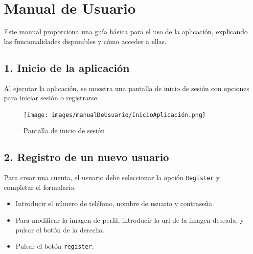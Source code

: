 \section*{Manual de Usuario}

Este manual proporciona una guía básica para el uso de la aplicación, explicando las funcionalidades disponibles y cómo acceder a ellas.

\subsection*{1. Inicio de la aplicaci\'on}
Al ejecutar la aplicación, se muestra una pantalla de inicio de sesión con opciones para iniciar sesión o registrarse.

\begin{figure}[H]
    \centering
    \texttt{[image: images/manualDeUsuario/InicioAplicación.png]}
    \caption*{Pantalla de inicio de sesión}
\end{figure}

\subsection*{2. Registro de un nuevo usuario}
Para crear una cuenta, el usuario debe seleccionar la opción \texttt{Register} y completar el formulario.

\begin{itemize}
    \item Introducir el número de teléfono, nombre de usuario y contraseña.
    \item Para modificar la imagen de perfil, introducir la url de la imagen deseada, y pulsar el botón de la derecha.
    \item Pulsar el botón \texttt{register}.
\end{itemize}

